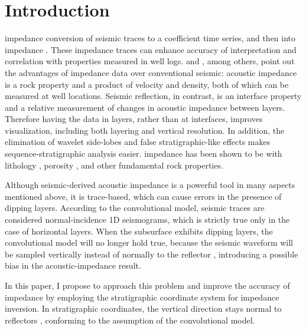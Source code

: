 \section{Introduction}
 impedance  conversion of seismic traces to a  coefficient time series, and then into  impedance \cite[]{lavergne1977,lindseth1979}.  These impedance traces can enhance accuracy of interpretation and correlation with properties measured in well logs. \cite{duboz1998} and \cite{latimer2000}, among others, point out the advantages of impedance data over conventional seismic: acoustic impedance is a rock property and a product of velocity and density, both of which can be measured at well locations. Seismic reflection, in contrast, is an interface property and a relative measurement of changes in acoustic impedance between layers. Therefore having the data in layers, rather than at interfaces, improves visualization, including both layering and vertical resolution. In addition, the elimination of wavelet side-lobes and false stratigraphic-like effects makes sequence-stratigraphic analysis easier.  impedance has been shown to be  with lithology \cite[]{pendrel1997}, porosity \cite[]{brown1996,burge1998}, and other fundamental rock properties. 

Although seismic-derived acoustic impedance is a powerful tool in many aspects mentioned above, it is trace-based, which can cause errors in the presence of dipping layers. According to the convolutional model, seismic traces are considered normal-incidence 1D seismograms, which is strictly true only in the case of horizontal layers. When the subsurface exhibits dipping layers, the convolutional model will no longer hold true, because the seismic waveform will be sampled vertically instead of normally to the reflector \cite[]{guomarfurt}, introducing a possible bias in the acoustic-impedance result.

In this paper, I propose to approach this problem and improve the accuracy of impedance  by employing the stratigraphic coordinate system \cite[]{karimi2011,karimi2014} for impedance inversion. In stratigraphic coordinates, the vertical direction stays normal to reflectors , conforming to the assumption of the convolutional model.

